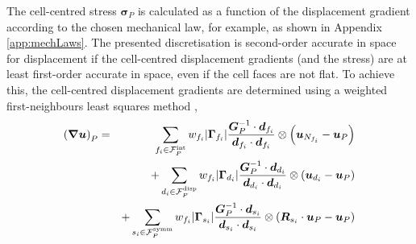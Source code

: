 \documentclass[sn-mathphys,Numbered]{sn-jnl}%
\newcommand{\bb}{\boldsymbol}
\begin{document}
The cell-centred stress $\bb{\sigma}_P$ is calculated as a function of the displacement gradient according to the chosen mechanical law, for example, as shown in Appendix \ref{app:mechLaws}.
The presented discretisation is second-order accurate in space for displacement if the cell-centred displacement gradients (and the stress) are at least first-order accurate in space, even if the cell faces are not flat.
To achieve this, the cell-centred displacement gradients are determined using a weighted first-neighbours least squares method \citep{Jasak1996},
\begin{eqnarray} \label{eq:leastSquaresGrad}
	\left(\bb{\nabla}\bb{u}\right)_P
		&=&\sum_{f_i \in \mathcal{F}^{\text{int}}_P} w_{f_i} |\bb{\Gamma}_{f_i}| \frac{\bb{G}^{-1}_P \cdot \bb{d}_{f_i}}{\bb{d}_{f_i} \cdot \bb{d}_{f_i}}  \otimes \left(\bb{u}_{N_{f_i}} - \bb{u}_P \right) \notag \\
		&&+ \sum_{d_i \in \mathcal{F}^{\text{disp}}_P} w_{f_i} |\bb{\Gamma}_{d_i}| \frac{ \bb{G}^{-1}_P \cdot \bb{d}_{d_i} }{\bb{d}_{d_i} \cdot \bb{d}_{d_i}} \otimes \left(\bb{u}_{d_i} - \bb{u}_P \right) \notag \\
		&&+ \sum_{s_i \in \mathcal{F}^{\text{symm}}_P} w_{f_i} |\bb{\Gamma}_{s_i}| \frac{\bb{G}^{-1}_P \cdot \bb{d}_{s_i}}{\bb{d}_{s_i} \cdot \bb{d}_{s_i}} \otimes \left(\bb{R}_{s_i} \cdot \bb{u}_P - \bb{u}_P \right)
\end{eqnarray}
\end{document}
